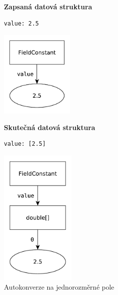 \documentclass[FM,bw,DP]{tulthesis}
\begin{document}
\begin{figure}[ht]
\begin{minipage}[t]{0.45\linewidth}
\vspace{0pt}
\textbf{Zapsaná datová struktura}\\
\vspace{-5pt}
\begin{lstlisting}
value: 2.5
\end{lstlisting}
\vspace*{-20pt}
\begin{center}
\includegraphics[height=120pt]{../img/autoconversion_array_1_before.pdf}
\end{center}
\end{minipage}
\quad
\begin{minipage}[t]{0.45\linewidth}
\vspace{0pt}
\textbf{Skutečná datová struktura}\\
\vspace{-5pt}
\begin{lstlisting}
value: [2.5]
\end{lstlisting}
\vspace*{-20pt}
\begin{center}
\includegraphics[height=190pt]{../img/autoconversion_array_1_after.pdf}
\end{center}
\end{minipage}
\caption{Autokonverze na jednorozměrné pole}
\label{img:autoconversion_array_1}
\end{figure}	
\end{document}
